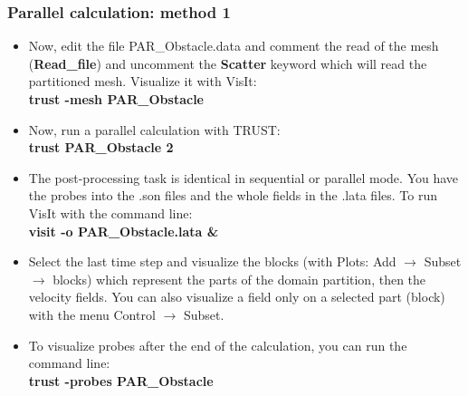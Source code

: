 \documentclass[10pt]{beamer}
\begin{document}
\begin{frame}
\frametitle{Parallel calculation: method 1}
\begin{block}{}

\begin{itemize}
\item Now, edit the file PAR\_Obstacle.data and comment the read of the mesh
(\textbf{Read\_file}) and uncomment the \textbf{Scatter} keyword which will read the partitioned
mesh. Visualize it with VisIt:\\
\textbf{trust -mesh PAR\_Obstacle}

\item Now, run a parallel calculation with TRUST:\\
\textbf{trust PAR\_Obstacle 2}

\item The post-processing task is identical in sequential or parallel mode. You have the
probes into the .son files and the whole fields in the .lata files. To run VisIt with the
command line:\\
\textbf{visit -o PAR\_Obstacle.lata \&}

\item Select the last time step and visualize the blocks (with Plots: Add $\rightarrow$ Subset $\rightarrow$ blocks)
which represent the parts of the domain partition, then the velocity fields. You can
also visualize a field only on a selected part (block) with the menu Control $\rightarrow$ Subset.

\item To visualize probes after the end of the calculation, you can run the command line:\\
\textbf{trust -probes PAR\_Obstacle}
\end{itemize}

\end{block}
\end{frame}
\end{document}
